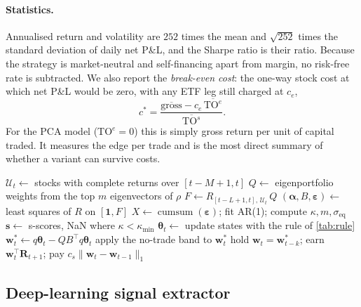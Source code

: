 \paragraph{Statistics.} Annualised return and volatility are $252$ times the mean and
$\sqrt{252}$ times the standard deviation of daily net P\&L, and the Sharpe ratio is their ratio.
Because the strategy is market-neutral and self-financing apart from margin, no risk-free rate
is subtracted. We also report the \emph{break-even cost}: the one-way stock cost at which net
P\&L would be zero, with any ETF leg still charged at $c_e$,
\begin{equation}
  c^\ast = \frac{\overline{\text{gross}} - c_e\,\overline{\text{TO}^{e}}}{\overline{\text{TO}^{s}}} .
  \label{eq:breakeven}
\end{equation}
For the PCA model ($\text{TO}^e = 0$) this is simply gross return per unit of capital traded.
It measures the edge per trade and is the most direct summary of whether a variant can survive
costs.

\begin{algorithm}[ht]
\caption{One trading day $t$ of the strategy}
\label{alg:daily}
\begin{algorithmic}[1]
\State $\mathcal U_t \gets$ stocks with complete returns over $[t-M+1, t]$
\State $Q \gets$ eigenportfolio weights from the top $m$ eigenvectors of $\rho$ 
\State $F \gets R_{[t-L+1,t],\,\mathcal U_t}\, Q$ 
\State $(\bm\alpha, B, \bm\varepsilon) \gets$ least squares of $R$ on $[\bm 1, F]$ 
\State $X \gets \operatorname{cumsum}(\bm\varepsilon)$; fit AR(1); compute $\kappa, m, \sigma_{\text{eq}}$ 
\State $\bm s \gets$ s-scores, NaN where $\kappa < \kappa_{\min}$ 
\State $\bm\theta_t \gets$ update states with the rule of \cref{tab:rule}
\State $\bm w^\ast_t \gets q\bm\theta_t - Q B^\top q\bm\theta_t$ 
\State apply the no-trade band to $\bm w^\ast_t$ 
\State hold $\bm w_t = \bm w^\ast_{t-k}$; earn $\bm w_t^\top \bm R_{t+1}$; pay $c_s\|\bm w_t - \bm w_{t-1}\|_1$ 
\end{algorithmic}
\end{algorithm}

\subsection{Deep-learning signal extractor}
\label{sec:method:deep}

